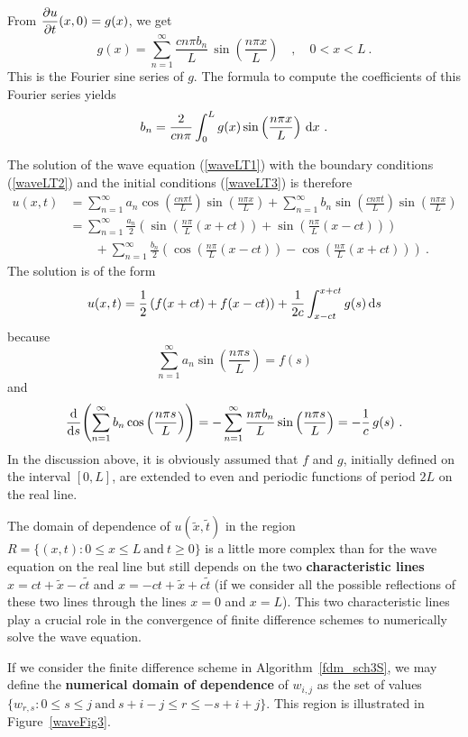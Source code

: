 From $\DS \pdydx{u}{t}(x,0) = g(x)$, we get
\[
g(x) = \sum_{n=1}^\infty \frac{cn\pi b_n}{L}\,
\sin\left(\frac{n\pi x}{L}\right)
\quad , \quad 0<x<L \ .
\]
This is the Fourier sine series of $g$.  The formula to compute the
coefficients of this Fourier series yields
\[
b_n = \frac{2}{cn\pi} \int_0^L g(x)
\sin\left(\frac{n\pi x}{L}\right) \dx{x} \ .
\]

The solution of the wave equation (\ref{waveLT1}) with the boundary
conditions (\ref{waveLT2}) and the initial conditions (\ref{waveLT3})
is therefore
\begin{align*}
u(x,t) &= \sum_{n=1}^\infty a_n \cos\left(\frac{cn\pi t}{L}\right)
\sin\left(\frac{n\pi x}{L}\right)
+ \sum_{n=1}^\infty b_n \sin\left(\frac{cn\pi t}{L}\right)
\sin\left(\frac{n\pi x}{L}\right) \\
&= \sum_{n=1}^\infty \frac{a_n}{2}
\left( \sin\left(\frac{n\pi}{L}(x+ct)\right)
+ \sin\left(\frac{n\pi}{L}(x-ct)\right)\right) \\
&\qquad + \sum_{n=1}^\infty \frac{b_n}{2}
\left( \cos\left(\frac{n\pi}{L}(x-ct)\right)
- \cos\left(\frac{n\pi}{L}(x+ct)\right)\right) \ .
\end{align*}
The solution is of the form
\[
u(x,t) = \frac{1}{2} \left( f(x+ct) + f(x-ct) \right)
+ \frac{1}{2c} \int_{x-ct}^{x+ct} g(s) \dx{s}
\]
because
\[
\sum_{n=1}^\infty a_n \sin\left(\frac{n\pi s}{L}\right) = f(s)
\]
and
\[
\dfdx{\left( \sum_{n=1}^\infty b_n \cos\left(\frac{n\pi s}{L}\right)\right)}{s}
= -\sum_{n=1}^\infty \frac{n\pi b_n}{L} \sin\left(\frac{n\pi s}{L}\right)
= -\frac{1}{c}\, g(s) \ .
\]
In the discussion above, it is obviously assumed that $f$ and $g$,
initially defined on the interval $[0,L]$, are extended to
even and periodic functions of period $2L$ on the real line.

The domain of dependence of $u(\tilde{x},\tilde{t})$ in the region
$R = \{ (x,t) : 0\leq x \leq L \ \text{and}\  t \geq 0 \}$ is a little
more complex than for the wave equation on the real line but still
depends on the two
{\bfseries characteristic lines}
$x = ct + \tilde{x} - c \tilde{t}$ and
$x = - ct + \tilde{x} + c \tilde{t}$ (if we consider all the possible
reflections of these two lines through the lines $x=0$ and $x= L$).
This two characteristic lines play a crucial role in the convergence
of finite difference schemes to numerically solve the wave equation.

If we consider the finite difference scheme in
Algorithm~\ref{fdm_sch3S}, we may define the
{\bfseries numerical domain of dependence} of $w_{i,j}$ as the set of values
$\{ w_{r,s} : 0 \leq s \leq j \ \text{and} \ s + i - j \leq r \leq -s
+ i + j \}$.  This region is illustrated in Figure~\ref{waveFig3}.


